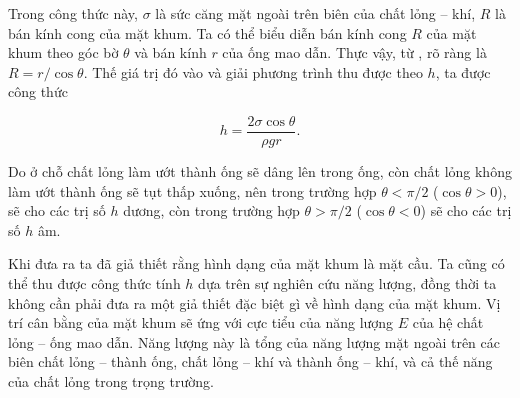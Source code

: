 Trong công thức này, $\sigma$ là sức căng mặt ngoài trên biên của chất lỏng -- khí, $R$ là bán kính cong của mặt khum. Ta có thể biểu diễn bán kính cong $R$ của mặt khum theo góc bờ $\theta$ và bán kính $r$ của ống mao dẫn. Thực vậy, từ , rõ ràng là $R=r/\cos\theta$. Thế giá trị đó vào  và giải phương trình thu được theo $h$, ta được công thức

\begin{equation}\label{eq:14_9}
	h = \frac{2\sigma\cos\theta}{\rho gr}.
\end{equation}


Do ở chỗ chất lỏng làm ướt thành ống sẽ dâng lên trong ống, còn chất lỏng không làm ướt thành ống sẽ tụt thấp xuống, nên trong trường hợp $\theta<\pi/2$ ($\cos\theta>0$),  sẽ cho các trị số $h$ dương, còn trong trường hợp $\theta>\pi/2$ ($\cos\theta<0$) sẽ cho các trị số $h$ âm.


Khi đưa ra  ta đã giả thiết rằng hình dạng của mặt khum là mặt cầu. Ta cũng có thể thu được công thức tính $h$ dựa trên sự nghiên cứu năng lượng, đồng thời ta không cần phải đưa ra một giả thiết đặc biệt gì về hình dạng của mặt khum. Vị trí cân bằng của mặt khum sẽ ứng với cực tiểu của năng lượng $E$ của hệ chất lỏng -- ống mao dẫn. Năng lượng này là tổng của năng lượng mặt ngoài trên các biên chất lỏng -- thành ống, chất lỏng -- khí và thành ống -- khí, và cả thế năng của chất lỏng trong trọng trường.

